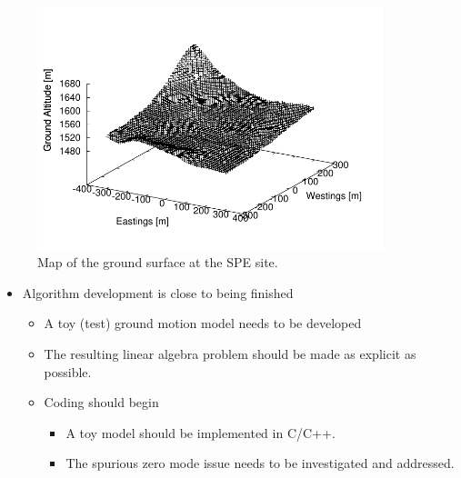 \documentclass[]{article}
\begin{document}
{\color{Blue} 
\vspace*{15pt}


\vspace*{10pt}

\begin{figure}[h]
  \centering
  \includegraphics[height=200pt]{figures/SPE_ground_surface.pdf}
  \caption{{\color{Blue} Map of the ground surface at the SPE site.}}
\end{figure}


\begin{itemize}
\item[] Algorithm development is close to being finished
  \begin{itemize}
  \item A toy (test) ground motion model needs to be developed
  \item The resulting linear algebra problem should be made as explicit as possible.
  \item Coding should begin 
    \begin{itemize}
    \item A toy model should be implemented in C/C++.
    \item The spurious zero mode issue needs to be investigated and addressed. 
    \end{itemize}
  \end{itemize}
\end{itemize}

\vspace*{10pt}


\vspace*{10pt}

}
\end{document}
